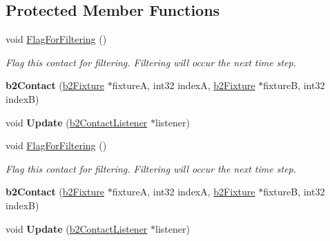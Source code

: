 \subsection*{Protected Member Functions}
\begin{DoxyCompactItemize}
\item 
\mbox{\label{classb2Contact_a44a3d32149021269eb9dfd4015c98e0d}} 
void \hyperlink{classb2Contact_a44a3d32149021269eb9dfd4015c98e0d}{Flag\+For\+Filtering} ()
\begin{DoxyCompactList}\small\item\em Flag this contact for filtering. Filtering will occur the next time step. \end{DoxyCompactList}\item 
\mbox{\label{classb2Contact_a2d1c98399cef1eb95c6ee8aad8257f60}} 
{\bfseries b2\+Contact} (\hyperlink{classb2Fixture}{b2\+Fixture} $\ast$fixtureA, int32 indexA, \hyperlink{classb2Fixture}{b2\+Fixture} $\ast$fixtureB, int32 indexB)
\item 
\mbox{\label{classb2Contact_a218a66a6c34e3de1c428aa73a0680dfe}} 
void {\bfseries Update} (\hyperlink{classb2ContactListener}{b2\+Contact\+Listener} $\ast$listener)
\item 
\mbox{\label{classb2Contact_a44a3d32149021269eb9dfd4015c98e0d}} 
void \hyperlink{classb2Contact_a44a3d32149021269eb9dfd4015c98e0d}{Flag\+For\+Filtering} ()
\begin{DoxyCompactList}\small\item\em Flag this contact for filtering. Filtering will occur the next time step. \end{DoxyCompactList}\item 
\mbox{\label{classb2Contact_a2d1c98399cef1eb95c6ee8aad8257f60}} 
{\bfseries b2\+Contact} (\hyperlink{classb2Fixture}{b2\+Fixture} $\ast$fixtureA, int32 indexA, \hyperlink{classb2Fixture}{b2\+Fixture} $\ast$fixtureB, int32 indexB)
\item 
\mbox{\label{classb2Contact_a218a66a6c34e3de1c428aa73a0680dfe}} 
void {\bfseries Update} (\hyperlink{classb2ContactListener}{b2\+Contact\+Listener} $\ast$listener)
\end{DoxyCompactItemize}

